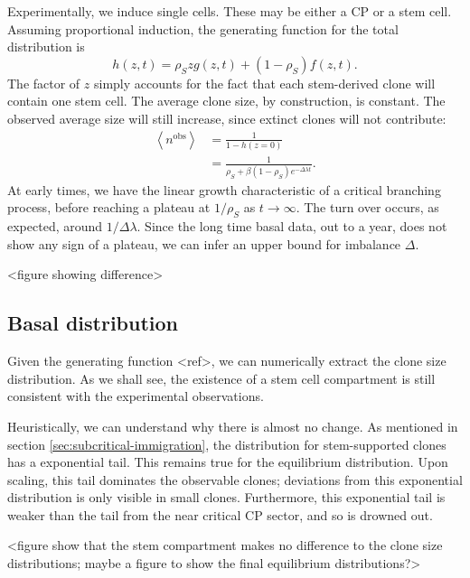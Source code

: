 \documentclass[10pt,UKenglish]{article}
\begin{document}
Experimentally, we induce single cells. These may be either a CP or a stem cell. Assuming proportional induction, the generating function for the total distribution is $$h(z,t) = \rho_S z g(z,t) + (1-\rho_S) f(z,t).$$ The factor of $z$ simply accounts for the fact that each stem-derived clone will contain one stem cell. The average clone size, by construction, is constant. The observed average size will still increase, since extinct clones will not contribute: 
\begin{align*}
\left\langle n^\textrm{obs} \right\rangle &= \frac{1}{1 - h(z=0)} \\
  &= \frac{1}{\rho_S + \beta (1-\rho_S) e^{-\Delta \lambda t}}.
\end{align*}
At early times, we have the linear growth characteristic of a critical branching process, before reaching a plateau at $1/\rho_S$ as $t\rightarrow\infty$. The turn over occurs, as expected, around $1/\Delta\lambda$. Since the long time basal data, out to a year, does not show any sign of a plateau, we can infer an upper bound for imbalance $\Delta$.

<figure showing difference>

\subsection{Basal distribution}

Given the generating function <ref>, we can numerically extract the clone size distribution. As we shall see, the existence of a stem cell compartment is still consistent with the experimental observations.

Heuristically, we can understand why there is almost no change. As mentioned in section \ref{sec:subcritical-immigration}, the distribution for stem-supported clones has a exponential tail. This remains true for the equilibrium distribution. Upon scaling, this tail dominates the observable clones; deviations from this exponential distribution is only visible in small clones. Furthermore, this exponential tail is weaker than the tail from the near critical CP sector, and so is drowned out.

<figure show that the stem compartment makes no difference to the clone size distributions; maybe a figure to show the final equilibrium distributions?>
\end{document}

